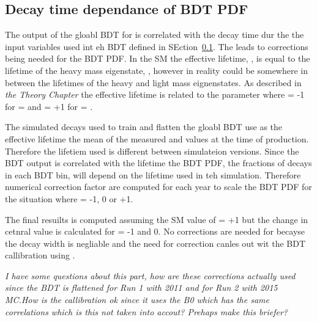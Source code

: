 \subsection{Decay time dependance of BDT PDF}
The output of the gloabl BDT for \bmumu is correlated with the \bmumu decay time dur the the input variables used int eh BDT defined in SEction~\ref{}. The leads to corrections being needed for the \bsmumu BDT PDF. In the SM the \bsmumu effective lifetime, \tmumu, is equal to the lifetime of the heavy \bs mass eigenstate, \tH, however in reality \tmumu could be somewhere in between the lifetimes of the heavy and light mass eignenstates. As described in {\it the Theory Chapter} the \bsmumu effective lifetime is related to the parameter \ADG where \ADG = -1 for \tmumu = \tL and \ADG = +1 for \tmumu = \tH.

The simulated decays used to train and flatten the gloabl BDT use as the \bsmumu effective lifetime the mean of the measured \tH and \tL values at the time of production. Therefore the lifetiem used is different between simulateion versions. Since the BDT output is correlated with the lifetime the BDT PDF, the fractions of \bsmumu decays in each BDT bin, will depend on the lifetime used in teh simulation. Therefore numerical correction factor are computed for each year to scale the BDT PDF for the situation where \ADF = -1, 0 or +1. 

The final resuilts is computed assuming the SM value of \ADG = +1 but the change in cetnral value is calculated for \ADG = -1 and 0. No corrections are needed for \bdmumu becayse the decay width is negliable and the need for correction canles out wit the BDT callibration using \bdkpi. 

{\it I have some questions about this part, how are these corrections actually used since the BDT is flattened for Run 1 with 2011 and for Run 2 with 2015 MC.How is the callibration ok since it uses the B0 which has the same correlations which is this not taken into accout? Prehaps make this briefer?}

